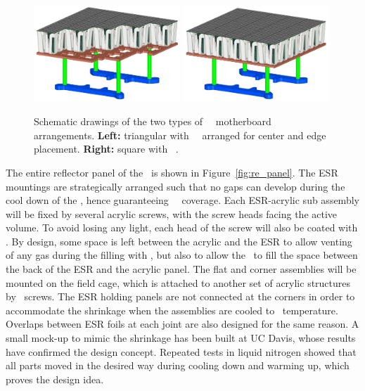 \begin{figure}[t!]
\includegraphics[width=0.49\textwidth]{./Figures/MB_TRB.png}
\includegraphics[width=0.49\textwidth]{./Figures/MB_SQB.png}
\caption[\DSks\ \DSkPdm\ motherboard designs]{Schematic drawings of the two types of \DSks\ \DSkPdm\ motherboard arrangements.  {\bf Left:} triangular with \DSkTRBPdmsNumber\ \DSkPdms\ arranged for center and edge placement.  {\bf Right:} square with \DSkSQBPdmsNumber\ \DSkPdms.}
\label{fig:3D-TRB-SQB}
\end{figure}

The entire reflector panel of the \TPC\ is shown in Figure~\ref{fig:re_panel}. The ESR mountings are strategically arranged such that no gaps can develop during the cool down of the \TPC, hence guaranteeing \DSkTPBCoverage\ \TPB\ coverage. Each ESR-acrylic sub assembly will be fixed by several acrylic screws, with the screw heads facing the active volume. To avoid losing any light, each head of the screw will also be coated with \TPB. By design, some space is left between the acrylic and the ESR to allow venting of any gas during the filling with \LAr, but also to allow the \LAr\ to fill the space between the back of the ESR and the acrylic panel. The flat and corner assemblies will be mounted on the field cage, which is attached to another set of acrylic structures by \PTFE\ screws. The ESR holding panels are not connected at the corners in order to accommodate the shrinkage when the assemblies are cooled to \LAr\ temperature. Overlaps between ESR foils at each joint are also designed for the same reason. A small mock-up to mimic the shrinkage has been built at UC Davis, whose results have confirmed the design concept. Repeated tests in liquid nitrogen showed that all parts moved in the desired way during cooling down and warming up, which proves the design idea.

